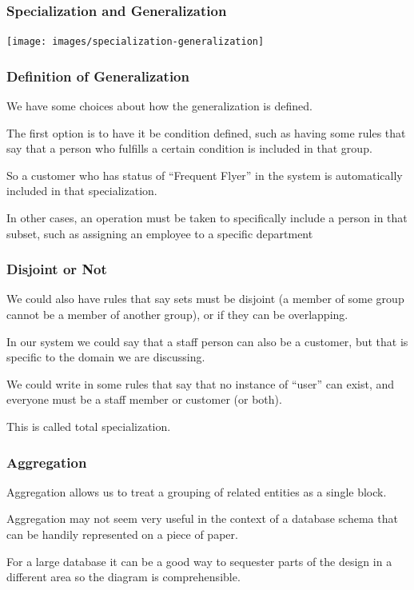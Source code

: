 \begin{frame}
\frametitle{Specialization and Generalization}

\begin{center}
\texttt{[image: images/specialization-generalization]}\end{center}

\end{frame}



\begin{frame}
\frametitle{Definition of Generalization}

We have some choices about how the generalization is defined. 

The first option is to have it be \alert{condition} defined, such as having some rules that say that a person who fulfills a certain condition is included in that group. 

So a customer who has status of ``Frequent Flyer'' in the system is automatically included in that specialization. 

In other cases, an operation must be taken to specifically include a person in that subset, such as assigning an employee to a specific department

\end{frame}



\begin{frame}
\frametitle{Disjoint or Not}

We could also have rules that say sets must be disjoint (a member of some group cannot be a member of another group), or if they can be overlapping. 

In our system we could say that a staff person can also be a customer, but that is specific  to the domain we are discussing. 

We could write in some rules that say that no instance of ``user'' can exist, and everyone must be a staff member or customer (or both).

This is called \alert{total specialization}.

\end{frame}




\begin{frame}
\frametitle{Aggregation}
Aggregation allows us to treat a grouping of related entities as a single block. 


Aggregation may not seem very useful in the context of a database schema that can be handily represented on a piece of paper.

For a large database it can be a good way to sequester parts of the design in a different area so the diagram is comprehensible.

\end{frame}



